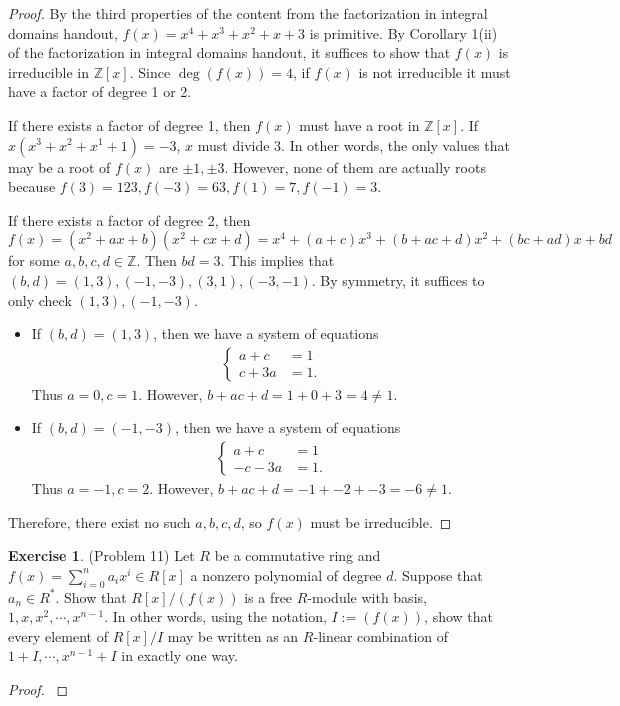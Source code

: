 \documentclass[12pt, psamsfonts]{amsart}
\theoremstyle{definition}
\newtheorem*{exer}{Exercise}
\theoremstyle{remark}
\numberwithin{equation}{section}
\begin{document}
\begin{proof}
  By the third properties of the content from the factorization in integral domains handout, $f(x) = x^4 + x^3 + x^2 + x + 3$ is primitive.
  By Corollary 1(ii) of the factorization in integral domains handout, it suffices to show that $f(x)$ is irreducible in $\mathbb{Z}[x]$.
  Since $\deg(f(x)) = 4$, if $f(x)$ is not irreducible it must have a factor of degree 1 or 2.

  If there exists a factor of degree 1, then $f(x)$ must have a root in $\mathbb{Z}[x]$.
  If $x(x^3 + x^2 + x^1 + 1) = -3$, $x$ must divide 3.
  In other words, the only values that may be a root of $f(x)$ are $\pm 1, \pm 3$.
  However, none of them are actually roots because $f(3) = 123, f(-3) = 63, f(1) = 7, f(-1) = 3$.

  If there exists a factor of degree 2, then $f(x) = (x^2 + ax + b)(x^2 + cx + d) = x^4 + (a + c)x^3 + (b + ac + d)x^2 + (bc + ad)x + bd$ for some $a, b, c, d \in \mathbb{Z}$.
  Then $bd = 3$.
  This implies that $(b, d) = (1, 3), (-1, -3), (3, 1), (-3, -1)$.
  By symmetry, it suffices to only check $(1, 3), (-1, -3)$.
  \begin{itemize}
    \item
      If $(b, d) = (1, 3)$, then we have a system of equations
      \begin{align*}
        \begin{cases}
          a + c &= 1 \\
          c + 3a &= 1.
        \end{cases}
      \end{align*}
      Thus $a = 0, c = 1$.
      However, $b + ac + d = 1 + 0 + 3 = 4 \ne 1$.
    \item
      If $(b, d) = (-1, -3)$, then we have a system of equations
      \begin{align*}
        \begin{cases}
          a + c &= 1 \\
          -c - 3a &= 1.
        \end{cases}
      \end{align*}
      Thus $a = -1, c = 2$.
      However, $b + ac + d = -1 + -2 + -3 = -6 \ne 1$.
  \end{itemize}
  Therefore, there exist no such $a, b, c, d$, so $f(x)$ must be irreducible.
\end{proof}

\begin{exer}{(Problem 11)}
  Let $R$ be a commutative ring and $f(x) = \sum_{i=0}^{n} a_ix^i \in R[x]$ a nonzero polynomial of degree $d$.
  Suppose that $a_n \in R^*$.
  Show that $R[x]/(f(x))$ is a free $R$-module with basis, $1, x, x^2, \cdots, x^{n - 1}$.
  In other words, using the notation, $I := (f(x))$, show that every element of $R[x]/I$ may be written as an $R$-linear combination of $1 + I, \cdots, x^{n - 1} + I$ in exactly one way.
\end{exer}

\begin{proof}
  $ $
\end{proof}
\end{document}
